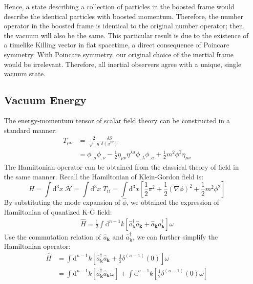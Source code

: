 \documentclass[12pt]{article}
\numberwithin{equation}{section}
\theoremstyle{1style}
\newcommand{\id}{\mathrm{d}}
\begin{document}
Hence, a state describing a collection of particles in the boosted frame would describe the identical particles with boosted momentum.
Therefore, the number operator in the boosted frame is identical to the original number operator; then, the vacuum will also be the same.
This particular result is due to the existence of a timelike Killing vector in flat spacetime, a direct consequence of Poincare symmetry.
With Poincare symmetry, our original choice of the inertial frame would be irrelevant.
Therefore, all inertial observers agree with a unique, single vacuum state.

\subsection{Vacuum Energy}
The energy-momentum tensor of scalar field theory can be constructed in a standard manner:
\begin{align}
  T_{\mu\nu} & =\frac{2}{\sqrt[]{-g}}\frac{\delta S}{\delta(g^{\mu\nu})}                                         \\
             & =\phi_{,\mu}\phi_{,\nu}-\frac{1}{2}\eta_{\mu\nu}\eta^{\lambda\sigma}\phi_{,\lambda}\phi_{,\sigma}
  +\frac{1}{2}m^2\phi^2\eta_{\mu\nu}
\end{align}
The Hamiltonian operator can be obtained from the classical theory of field in the same manner.
Recall the Hamiltonian of Klein-Gordon field is:
\begin{equation}
  H=\int\id^3x\;\mathcal{H}=\int\id^3x\;T_{tt}=\int\id^3x\left[\frac{1}{2}\pi^2+\frac{1}{2}(\nabla\phi)^2+\frac{1}{2}m^2\phi^2\right]
\end{equation}
By substituting the mode expansion of \(\hat{\phi}\), we obtained the expression of Hamiltonian of quantized K-G field:
\begin{align}
  \hat{H}=\frac{1}{2}\int \id^{n-1}k\left[\hat{a}^{\dagger}_{\mathbf{k}}\hat{a}_{\mathbf{k}}+\hat{a}_{\mathbf{k}}\hat{a}^{\dagger}_{\mathbf{k}}\right]\omega
\end{align}
Use the commutation relation of \(\hat{a}_{\mathbf{k}}\) and \(\hat{a}^{\dagger}_{\mathbf{k}}\), we can further simplify the Hamiltonian operator:
\begin{align}\label{134}
  \hat{H} & =\int \id^{n-1}k\left[\hat{a}^{\dagger}_{\mathbf{k}}\hat{a}_{\mathbf{k}}+\frac{1}{2}\delta^{(n-1)}(0)\right]\omega \\
          & =\int \id^{n-1}k\left[\hat{a}^{\dagger}_{\mathbf{k}}\hat{a}_{\mathbf{k}}\omega\right]+
  \int \id^{n-1}k\left[\frac{1}{2}\delta^{(n-1)}(0)\omega\right]
\end{align}
\end{document}

